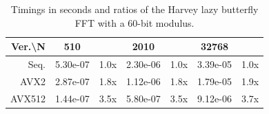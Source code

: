 \documentclass[10pt]{beamer}
\begin{document}
\begin{frame}
\begin{table}[h!]
\begin{tabular}{|r|*{3}{c c|}}
            \hline
            \rowcolor{myGray}
            Ver.\textbackslash N & 510 & & 2010 & & 32768 & \\
            \hline
            \cellcolor{myGray} Seq. & 5.30e-07 & 1.0x & 2.30e-06 & 1.0x & 3.39e-05 & 1.0x \\
            \hline
            \cellcolor{myGray} AVX2 & 2.87e-07 & 1.8x & 1.12e-06 & 1.8x & 1.79e-05 & 1.9x \\
            \hline
            \cellcolor{myGray} AVX512 & 1.44e-07 & 3.5x & 5.80e-07 & 3.5x & 9.12e-06 & 3.7x \\
            \hline
        \end{tabular}
        \caption{Timings in seconds and ratios of the Harvey lazy butterfly FFT with a 60-bit modulus.}
    \end{table}
\end{frame}
\end{document}
